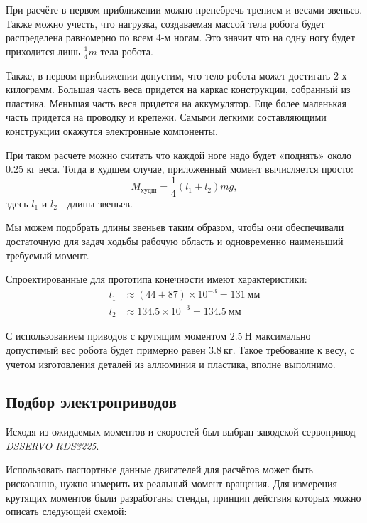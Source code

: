 При расчёте в первом приближении можно пренебречь трением и весами звеньев. Также можно учесть, что нагрузка, создаваемая массой тела робота будет распределена равномерно по всем 4-м ногам. Это значит что на одну ногу будет приходится лишь $\frac{1}{4}m$ тела робота.

Также, в первом приближении допустим, что тело робота может достигать 2-х килограмм. Большая часть веса придется на каркас конструкции, собранный из пластика. Меньшая часть веса придется на аккумулятор. Еще более маленькая часть придется на проводку и крепежи. Самыми легкими составляющими конструкции окажутся электронные компоненты.

При таком расчете можно считать что каждой ноге надо будет «поднять» около 0.25 кг веса. Тогда в худшем случае, приложенный момент вычисляется просто:
$$ M_{худш}= \frac 1 4 (l_{1}+l_{2}) m g, $$
\noindent здесь $l_1$ и $l_2$ - длины звеньев.

Мы можем подобрать длины звеньев таким образом, чтобы они обеспечивали достаточную для задач ходьбы рабочую область и одновременно наименьший требуемый момент.

Спроектированные для прототипа конечности имеют характеристики:
\begin{align*}
    l_1 &\approx (44 + 87) \times 10^{-3} = 131\: мм \\
    l_2 &\approx 134.5 \times 10^{-3} = 134.5\: мм
\end{align*}

\noindent С использованием приводов с крутящим моментом $ 2.5 \: Н $ максимально допустимый вес робота будет примерно равен $ 3.8 \: кг $. Такое требование к весу, с учетом изготовления деталей из аллюминия и пластика, вполне выполнимо.

\subsection{Подбор электроприводов} \label{sec:elprivod_selection}

Исходя из ожидаемых моментов и скоростей был выбран заводской сервопривод \textit{DSSERVO RDS3225}.

Использовать паспортные данные двигателей для расчётов может быть рискованно, нужно измерить их реальный момент вращения. Для измерения крутящих моментов были разработаны стенды, принцип действия которых можно описать следующей схемой:

